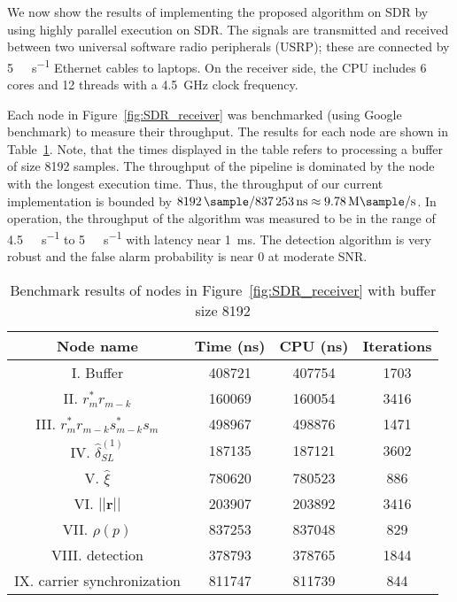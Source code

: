 We now show the results of implementing the proposed algorithm on SDR
by using
highly parallel execution on SDR.
The signals are transmitted and received between two universal software radio peripherals (USRP);
these are connected by \SI[per-mode=symbol]{5}{\giga\bits\per\second} Ethernet cables to
laptops.
On the receiver side, 
the CPU includes 6 cores and 12 threads with a \SI{4.5}{\giga\hertz}
clock frequency.

Each node in Figure~\ref{fig:SDR_receiver} was benchmarked (using Google benchmark) to measure their throughput.
The results for each node are shown 
in Table~\ref{table:BM_function_nodes}.
Note, that the times displayed in the table
refers to processing a  buffer of size 8192 samples.
The throughput of the 
pipeline is dominated by the node with the longest execution time.
Thus, the  throughput of our current implementation is bounded by
$\SI{8192}{\sample}/\SI{837253}{\nano\second}  \approx \SI[per-mode=symbol]{9.78}{\mega\sample\per\second}$.
In operation, the throughput of the algorithm was measured to be in
the range of
\SI[per-mode=symbol]{4.5}{\mega\sample\per\second} to \SI[per-mode=symbol]{5}{\mega\sample\per\second} with latency near \SI{1}{\milli\second}.
The detection algorithm is very robust and the false alarm probability is near 0 at moderate SNR.

\begin{table}[t]
    \caption{Benchmark results of nodes in Figure~\ref{fig:SDR_receiver} with buffer size 8192}  %
    \centering %
    \begin{tabular}{c c c c} %
    \hline\hline %
    Node name & Time (ns) & CPU (ns) & Iterations \\ [0.5ex] %
    \hline %
    I. Buffer  & 408721 & 407754 & 1703 \\ %
    II. $r_m^*r_{m-k}$  & 160069 & 160054 & 3416 \\
    III. $r_m^*r_{m-k}s_{m-k}^*s_m$ & 498967 & 498876 & 1471 \\
    IV. $\hat{\delta}_{SL}^{(1)}$ & 187135 & 187121 & 3602 \\
    V. $\hat{\xi}$ & 780620 & 780523 & 886 \\
    VI. $||\bm{r}||$ & 203907 & 203892 & 3416 \\ %
    VII. $\rho(p)$ & 837253 & 837048 & 829 \\
    VIII. detection & 378793 & 378765 & 1844 \\
    IX. carrier synchronization & 811747 & 811739 & 844  \\ [1ex]
    \hline
    \end{tabular}
    \label{table:BM_function_nodes} %
  \end{table}


